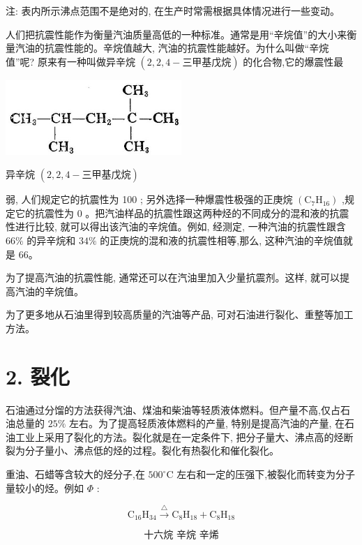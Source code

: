\documentclass[10pt]{article}
\begin{document}
注: 表内所示沸点范围不是绝对的, 在生产时常需根据具体情况进行一些变动。

人们把抗震性能作为衡量汽油质量高低的一种标准。通常是用“辛烷值”的大小来衡量汽油的抗震性能的。辛烷值越大, 汽油的抗震性能越好。为什么叫做“辛烷值”呢? 原来有一种叫做异辛烷 \(\left( {2,2,4 - \text{三甲基戊烷}}\right)\) 的化合物,它的爆震性最

\begin{center}
\includegraphics[max width=0.5\textwidth]{images/01912d16-be99-77bb-9535-4f3ed8d9946f_97_619867.jpg}
\end{center}

异辛烷 \(\left( {2,2,4 - \text{三甲基戊烷}}\right)\)

弱, 人们规定它的抗震性为 100 ; 另外选择一种爆震性极强的正庚烷 \(\left( {{\mathrm{C}}_{7}{\mathrm{H}}_{16}}\right)\) ,规定它的抗震性为 0 。把汽油样品的抗震性跟这两种烃的不同成分的混和液的抗震性进行比较, 就可以得出该汽油的辛烷值。例如, 经测定, 一种汽油的抗震性跟含 \({66}\%\) 的异辛烷和 \({34}\%\) 的正庚烷的混和液的抗震性相等,那么, 这种汽油的辛烷值就是 66。

为了提高汽油的抗震性能, 通常还可以在汽油里加入少量抗震剂。这样, 就可以提高汽油的辛烷值。

为了更多地从石油里得到较高质量的汽油等产品, 可对石油进行裂化、重整等加工方法。

\section*{2. 裂化}

石油通过分馏的方法获得汽油、煤油和柴油等轻质液体燃料。但产量不高,仅占石油总量的 \({25}\%\) 左右。为了提高轻质液体燃料的产量, 特别是提高汽油的产量, 在石油工业上采用了裂化的方法。裂化就是在一定条件下, 把分子量大、沸点高的烃断裂为分子量小、沸点低的烃的过程。裂化有热裂化和催化裂化。

重油、石蜡等含较大的烃分子,在 \({500}^{ \circ }\mathrm{C}\) 左右和一定的压强下,被裂化而转变为分子量较小的烃。例如 \(\Phi\) :

\[
{\mathrm{C}}_{16}{\mathrm{H}}_{34}\overset{\bigtriangleup }{ \rightarrow }{\mathrm{C}}_{8}{\mathrm{H}}_{18} + {\mathrm{C}}_{8}{\mathrm{H}}_{18}
\]

\[
\text{十六烷 辛烷 辛烯}
\]
\end{document}

